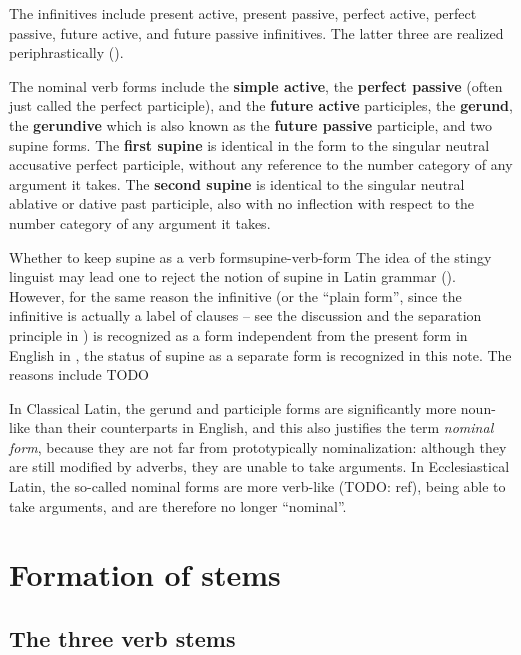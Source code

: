 \documentclass[a4paper, oneside]{report}
\newcommand*{\citepage}[1]{p.~{#1}}
\newcommand*{\concept}[1]{\textbf{#1}}
\newcommand*{\term}[1]{\emph{#1}}
\begin{document}
The infinitives include present active, present passive, perfect active, 
perfect passive, future active, and future passive infinitives.
The latter three are realized periphrastically ().

The nominal verb forms include 
the \concept{simple active}, 
the \concept{perfect passive} (often just called the perfect participle), 
and the \concept{future active} participles,
the \concept{gerund}, 
the \concept{gerundive} which is also known as the \concept{future passive} participle, 
and two supine forms.
The \concept{first supine} is identical in the form to the singular neutral accusative perfect participle,
without any reference to the number category of any argument it takes.
The \concept{second supine} is identical to the singular neutral ablative or dative past participle,
also with no inflection with respect to the number category of any argument it takes.

\begin{infobox}{Whether to keep supine as a verb form}{supine-verb-form}
    The idea of the stingy linguist may lead one to reject the notion of supine in Latin grammar
    ().
    However, for the same reason the infinitive 
    (or the ``plain form'', since the infinitive is actually a label of clauses 
    -- see the discussion and the separation principle in ) 
    is recognized as a form 
    independent from the present form in English in \citet[\citepage{74}]{cgel},
    the status of supine as a separate form is recognized in this note.
    The reasons include TODO
\end{infobox}

In Classical Latin, the gerund and participle forms are significantly more noun-like 
than their counterparts in English,
and this also justifies the term \term{nominal form},
because they are not far from prototypically nominalization:
although they are still modified by adverbs,
they are unable to take arguments.
In Ecclesiastical Latin, 
the so-called nominal forms are more verb-like (TODO: ref),
being able to take arguments,
and are therefore no longer ``nominal''.

\section{Formation of stems}\label{sec:verb-inflection.stem}

\subsection{The three verb stems}\label{sec:three-latin-stem}
\end{document}
